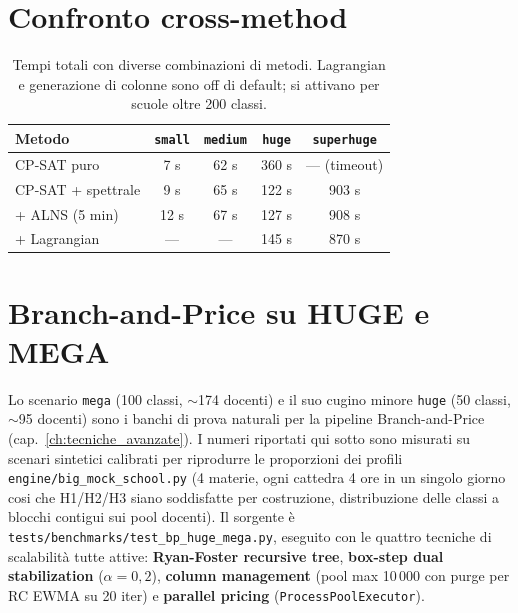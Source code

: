 \section{Confronto cross-method}

\begin{table}[h]
\centering
\sffamily\small
\begin{tabular}{lcccc}
\toprule
Metodo & \texttt{small} & \texttt{medium} & \texttt{huge} & \texttt{superhuge} \\
\midrule
CP-SAT puro       & 7 s & 62 s & 360 s & --- (timeout) \\
CP-SAT + spettrale & 9 s & 65 s & 122 s & 903 s \\
+ ALNS (5 min)    & 12 s & 67 s & 127 s & 908 s \\
+ Lagrangian      & --- & --- & 145 s & 870 s \\
\bottomrule
\end{tabular}
\caption{Tempi totali con diverse combinazioni di metodi.
Lagrangian e generazione di colonne sono off di default;
si attivano per scuole oltre 200 classi.}
\label{tab:bench-cross}
\end{table}

\section{Branch-and-Price su HUGE e MEGA}
\label{sec:bench-bp-huge-mega}

Lo scenario \texttt{mega} (100 classi, $\sim$174 docenti) e il
suo cugino minore \texttt{huge} (50 classi, $\sim$95 docenti)
sono i banchi di prova naturali per la pipeline
Branch-and-Price (cap.~\ref{ch:tecniche_avanzate}). I numeri
riportati qui sotto sono misurati su scenari sintetici
calibrati per riprodurre le proporzioni dei profili
\texttt{engine/big\_mock\_school.py} (4 materie, ogni cattedra
4 ore in un singolo giorno cosi che H1/H2/H3 siano soddisfatte
per costruzione, distribuzione delle classi a blocchi contigui
sui pool docenti). Il sorgente \`e
\texttt{tests/benchmarks/test\_bp\_huge\_mega.py}, eseguito con
le quattro tecniche di scalabilit\`a tutte attive:
\textbf{Ryan-Foster recursive tree}, \textbf{box-step dual
stabilization} ($\alpha=0{,}2$), \textbf{column management}
(pool max 10\,000 con purge per RC EWMA su 20 iter) e
\textbf{parallel pricing} (\texttt{ProcessPoolExecutor}).

